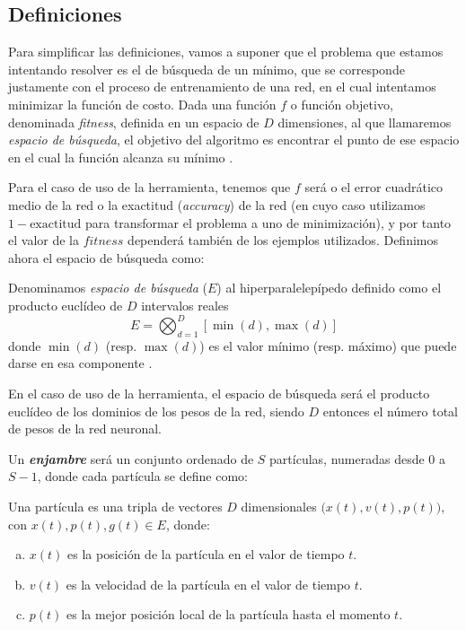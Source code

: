 \subsection{Definiciones}

Para simplificar las definiciones, vamos a suponer que el problema que estamos intentando resolver es el de búsqueda
de un mínimo, que se corresponde justamente con el proceso de entrenamiento de una red, en el cual intentamos minimizar
la función de costo. Dada una función $f$ o función objetivo, denominada \textit{fitness}, definida en un espacio de 
$D$ dimensiones, al que llamaremos \textit{espacio de búsqueda}, el objetivo del algoritmo es encontrar el punto de ese
espacio en el cual la función alcanza su mínimo \cite{clerc_12}.

\vspace{10pt}
Para el caso de uso de la herramienta, tenemos que $f$ será o el error cuadrático medio de la red o la 
exactitud (\textit{accuracy}) de la red (en cuyo caso utilizamos $1-\text{exactitud}$ para transformar el 
problema a uno de minimización), y por tanto el valor de la $\textit{fitness}$ dependerá también de los 
ejemplos utilizados. Definimos ahora el espacio de búsqueda como:

\begin{definicion}Denominamos \textit{espacio de búsqueda} ($E$) al hiperparalelepípedo 
definido como el producto euclídeo de $D$ intervalos reales
\begin{equation}
    E=\bigotimes_{d=1}^D[\min(d),\max(d)]
\end{equation}
donde $\min(d)$ (resp. $\max(d)$) es el valor mínimo (resp. máximo) que puede darse en esa componente \cite{clerc_12}.
\end{definicion}

En el caso de uso de la herramienta, el espacio de búsqueda será el producto euclídeo de los dominios de los pesos de
la red, siendo $D$ entonces el número total de pesos de la red neuronal.

\vspace{10pt}
Un \textbf{\textit{enjambre}} será un conjunto ordenado de $S$ partículas, numeradas desde $0$ a $S-1$, donde cada 
partícula se define como:

\begin{definicion}[Partícula] Una partícula es una tripla de vectores $D$ dimensionales $\big(x(t),v(t),p(t)\big)$, 
con 
$x(t),p(t),g(t)\in E$, donde:
\begin{enumerate}[(a)]
    \item $x(t)$ es la posición de la partícula en el valor de tiempo $t$.
    \item $v(t)$ es la velocidad de la partícula en el valor de tiempo $t$.
    \item $p(t)$ es la mejor posición local de la partícula hasta el momento $t$.
\end{enumerate}
\end{definicion}

